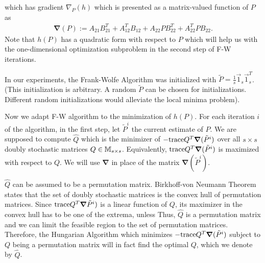 \documentclass[12pt,oneside,final]{thesis}\usepackage[]{graphicx}\usepackage[]{color}
\begin{document}
which has gradient $\nabla_{P}(h)$ which is presented  as a matrix-valued function of $P$ as 
\begin{eqnarray*}
\boldsymbol{\nabla}(P):=A_{21}B_{21}^T+A_{12}^TB_{12}+A_{22}PB_{22}^T+A_{22}^TPB_{22} .
\end{eqnarray*} Note that $h(P)$ has a quadratic form with respect to $P$ which will help us with the one-dimensional optimization subproblem in the second step of F-W iterations.


In our experiments,  the Frank-Wolfe Algorithm was initialized with
$\tilde{P}=\frac{1}{s}\vec{1}_{s} \vec{1}_{s}^T$. (This initialization is arbitrary. A random $\tilde{P}$ can be chosen for initializations. Different random initializations would alleviate the local minima problem). 

Now we adapt F-W algorithm to the minimization of $h(P)$.  For each iteration $i$ of the algorithm, in the first step, let $\tilde{P}^{i}$ the current estimate of $P$. We are supposed to compute  $\hat{Q}$ which is the minimizer of  $-\textup{trace} Q^{T}\boldsymbol{\nabla}(\tilde{P}^{i})$ over all $s \times s$ doubly stochastic matrices $Q \in \mathbb{M} _{s \times s}$. Equivalently, $\textup{trace} Q^{T}\boldsymbol{\nabla}(\tilde{P}^{i})$ is maximized with respect to $Q$. We will use  $\boldsymbol{\nabla}$ in place of the matrix $\boldsymbol{\nabla}(\tilde{P}^{i})$.

 $\hat{Q}$ can be assumed to be a permutation matrix. Birkhoff-von Neumann Theorem\cite{MatrixTheory} states that the set of doubly stochastic matrices is the convex hull of permutation matrices. Since $\textup{trace}{Q^{T}\boldsymbol{\nabla}\tilde{P}^{i})}$  is a linear function of $Q$, its maximizer in the convex hull has to be one of the extrema, unless 
Thus, $\hat{Q}$  is a permutation matrix and we can limit the feasible region to the set of permutation matrices.
Therefore, the  Hungarian Algorithm which minimizes $-\textup{trace} Q^{T}\boldsymbol{\nabla}(\tilde{P}^{i})$ subject to $Q$ being a permutation matrix will in fact find the optimal $Q$, which we denote by $\hat{Q}$.
\end{document}
